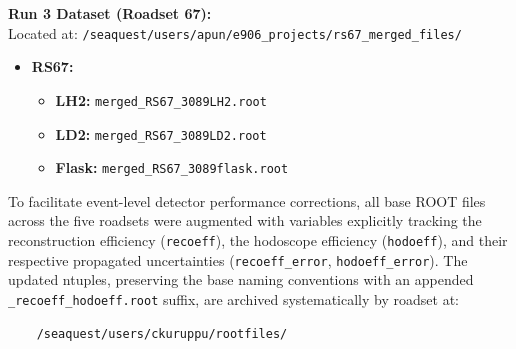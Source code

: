 \documentclass[11pt]{article}
\begin{document}
\vspace{0.2cm}
\noindent \textbf{Run 3 Dataset (Roadset 67):} \\
Located at: \texttt{/seaquest/users/apun/e906\_projects/rs67\_merged\_files/}
\begin{itemize}
    \item \textbf{RS67:} 
        \begin{itemize}
            \item \textbf{LH2:} \texttt{merged\_RS67\_3089LH2.root}
            \item \textbf{LD2:} \texttt{merged\_RS67\_3089LD2.root}
            \item \textbf{Flask:} \texttt{merged\_RS67\_3089flask.root}
        \end{itemize}
\end{itemize}

To facilitate event-level detector performance corrections, all base ROOT files across the five roadsets were augmented with variables explicitly tracking the reconstruction efficiency (\texttt{recoeff}), the hodoscope efficiency (\texttt{hodoeff}), and their respective propagated uncertainties (\texttt{recoeff\_error}, \texttt{hodoeff\_error}). The updated ntuples, preserving the base naming conventions with an appended \texttt{\_recoeff\_hodoeff.root} suffix, are archived systematically by roadset at:
\begin{verbatim}
    /seaquest/users/ckuruppu/rootfiles/
\end{verbatim}
\end{document}
